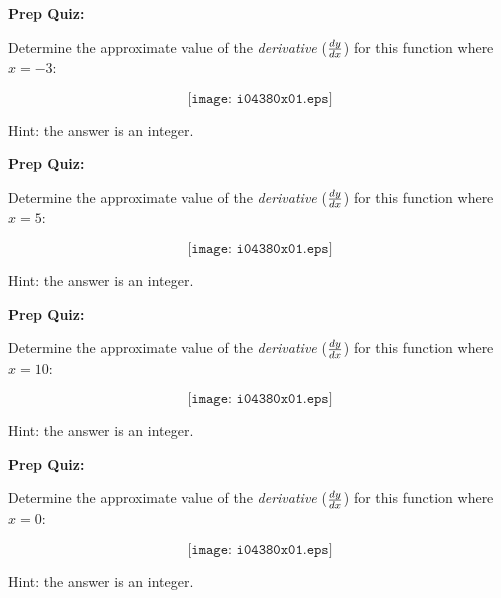 \vfil \eject

\noindent
{\bf Prep Quiz:}

Determine the approximate value of the {\it derivative} ($dy \over dx$) for this function where $x=-3$:

$$\texttt{[image: i04380x01.eps]}$$

Hint: the answer is an integer.








\vfil \eject

\noindent
{\bf Prep Quiz:}

Determine the approximate value of the {\it derivative} ($dy \over dx$) for this function where $x=5$:

$$\texttt{[image: i04380x01.eps]}$$

Hint: the answer is an integer.








\vfil \eject

\noindent
{\bf Prep Quiz:}

Determine the approximate value of the {\it derivative} ($dy \over dx$) for this function where $x=10$:

$$\texttt{[image: i04380x01.eps]}$$

Hint: the answer is an integer.










\vfil \eject

\noindent
{\bf Prep Quiz:}

Determine the approximate value of the {\it derivative} ($dy \over dx$) for this function where $x=0$:

$$\texttt{[image: i04380x01.eps]}$$

Hint: the answer is an integer.





